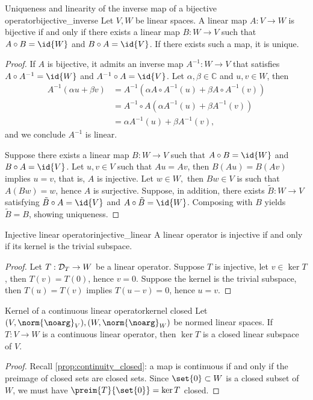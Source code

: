 \begin{proposition}{Uniqueness and linearity of the inverse map of a bijective operator}{bijective_inverse}
    Let \(V, W\) be linear spaces. A linear map \(A : V \to W\) is bijective if and only if there exists a linear map \(B : W \to V\) such that \(A\circ B = \id{W}\) and \(B \circ A = \id{V}\). If there exists such a map, it is unique.
\end{proposition}
\begin{proof}
    If \(A\) is bijective, it admits an inverse map \(A^{-1} : W \to V\) that satisfies \(A \circ A^{-1} = \id{W}\) and \(A^{-1} \circ A = \id{V}\). Let \(\alpha, \beta \in \mathbb{C}\) and \(u, v \in W\), then
    \begin{align*}
        A^{-1}(\alpha u + \beta v) &= A^{-1}\left(\alpha A\circ A^{-1}(u) + \beta A \circ A^{-1}(v)\right)\\
                                   &= A^{-1} \circ A \left(\alpha A^{-1}(u) + \beta A^{-1}(v)\right)\\
                                   &= \alpha A^{-1}(u) + \beta A^{-1}(v),
    \end{align*}
    and we conclude \(A^{-1}\) is linear.

    Suppose there exists a linear map \(B : W \to V\) such that \(A \circ B = \id{W}\) and \(B \circ A = \id{V}\). Let \(u, v \in V\) such that \(Au = Av\), then \(B(Au) = B(Av)\) implies \(u = v\), that is, \(A\) is injective. Let \(w \in W,\) then \(Bw \in V\) is such that \(A(Bw) = w\), hence \(A\) is surjective. Suppose, in addition, there exists \(\tilde{B} : W \to V\) satisfying \(\tilde{B} \circ A = \id{V}\) and \(A \circ \tilde{B} = \id{W}\). Composing with \(B\) yields \(\tilde{B} = B\), showing uniqueness.
\end{proof}

\begin{proposition}{Injective linear operator}{injective_linear}
    A linear operator is injective if and only if its kernel is the trivial subspace.
\end{proposition}
\begin{proof}
    Let \(T : \mathcal{D}_{T} \to W\) be a linear operator. Suppose \(T\) is injective, let \(v \in \ker{T}\), then \(T(v) = T(0)\), hence \(v = 0\). Suppose the kernel is the trivial subspace, then \(T(u) = T(v)\) implies \(T(u - v) = 0\), hence \(u = v\).
\end{proof}

\begin{proposition}{Kernel of a continuous linear operator}{kernel closed}
    Let \((V, \norm{\noarg}_V), (W, \norm{\noarg}_W)\) be normed linear spaces. If \(T : V \to W\) is a continuous linear operator, then \(\ker{T}\) is a closed linear subspace of \(V\).
\end{proposition}
\begin{proof}
    Recall \cref{prop:continuity_closed}: a map is continuous if and only if the preimage of closed sets are closed sets. Since \(\set{0} \subset W\) is a closed subset of \(W\), we must have \(\preim{T}{\set{0}} = \ker{T}\) closed.
\end{proof}

